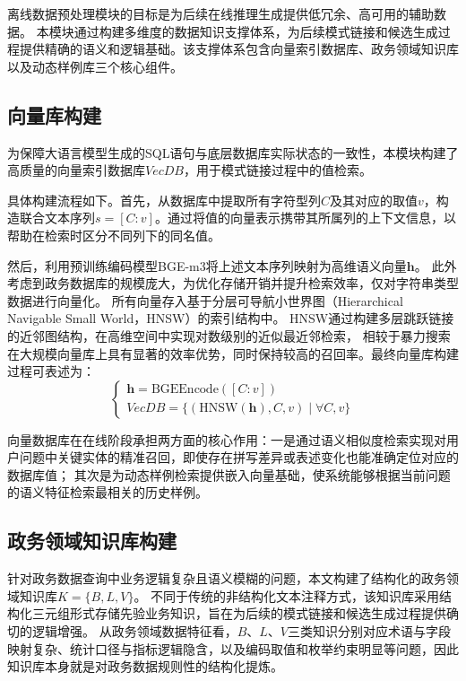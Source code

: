离线数据预处理模块的目标是为后续在线推理生成提供低冗余、高可用的辅助数据。
本模块通过构建多维度的数据知识支撑体系，为后续模式链接和候选生成过程提供精确的语义和逻辑基础。该支撑体系包含向量索引数据库、政务领域知识库以及动态样例库三个核心组件。

\subsection{向量库构建}\label{subsec:vector_database_construction}

为保障大语言模型生成的SQL语句与底层数据库实际状态的一致性，本模块构建了高质量的向量索引数据库$VecDB$，用于模式链接过程中的值检索。

具体构建流程如下。首先，从数据库中提取所有字符型列$C$及其对应的取值$v$，构造联合文本序列$s = [C : v]$。通过将值的向量表示携带其所属列的上下文信息，以帮助在检索时区分不同列下的同名值。

然后，利用预训练编码模型BGE-m3\cite{chen2024bge}将上述文本序列映射为高维语义向量$\mathbf{h}$。
此外考虑到政务数据库的规模庞大，为优化存储开销并提升检索效率，仅对字符串类型数据进行向量化。
所有向量存入基于分层可导航小世界图（Hierarchical Navigable Small World，HNSW）\cite{HNSW}的索引结构中。
HNSW通过构建多层跳跃链接的近邻图结构，在高维空间中实现对数级别的近似最近邻检索，
相较于暴力搜索在大规模向量库上具有显著的效率优势，同时保持较高的召回率。最终向量库构建过程可表述为：
\begin{equation}
	\begin{cases}
		\mathbf{h} = \text{BGEEncode}([C : v]) \\
		VecDB = \{(\text{HNSW}(\mathbf{h}), C, v) \mid \forall C, v\}
		\end{cases}
\end{equation}

向量数据库在在线阶段承担两方面的核心作用：一是通过语义相似度检索实现对用户问题中关键实体的精准召回，即使存在拼写差异或表述变化也能准确定位对应的数据库值；
其次是为动态样例检索提供嵌入向量基础，使系统能够根据当前问题的语义特征检索最相关的历史样例。

\subsection{政务领域知识库构建}\label{subsec:knowledge_base_construction}

针对政务数据查询中业务逻辑复杂且语义模糊的问题，本文构建了结构化的政务领域知识库$K = \{B, L, V\}$。
不同于传统的非结构化文本注释方式，该知识库采用结构化三元组形式存储先验业务知识，旨在为后续的模式链接和候选生成过程提供确切的逻辑增强。
从政务领域数据特征看，$B$、$L$、$V$三类知识分别对应术语与字段映射复杂、统计口径与指标逻辑隐含，以及编码取值和枚举约束明显等问题，因此知识库本身就是对政务数据规则性的结构化提炼。

